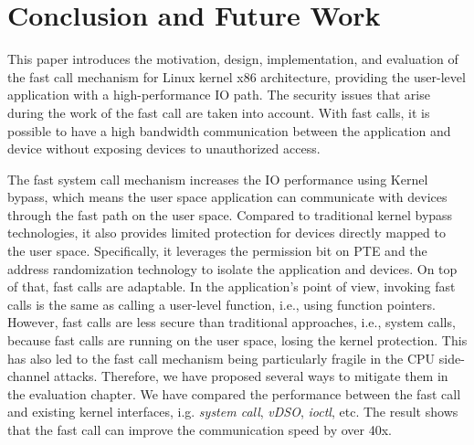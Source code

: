 \chapter{Conclusion and Future Work}
\label{sec:conclusion}




This paper introduces the motivation, design, implementation, 
and evaluation of the fast call mechanism for Linux kernel x86 
architecture, providing the user-level application with a 
high-performance IO path. The security issues that arise 
during the work of the fast call are taken into account. 
With fast calls, it is possible to have a high bandwidth 
communication between the application and device without 
exposing devices to unauthorized access.

The fast system call mechanism increases the IO performance using 
Kernel bypass, which means the user space application can communicate 
with devices through the fast path on the user space. Compared to 
traditional kernel bypass technologies, it also provides limited 
protection for devices directly mapped to the user space. 
Specifically, it leverages the permission bit on PTE and 
the address randomization technology to isolate the 
application and devices. On top of that,  fast calls 
are adaptable. In the application's point of view, 
invoking fast calls is the same as calling a user-level 
function, i.e., using function pointers.  However,  
fast calls are less secure than traditional approaches, i.e., 
system calls, because fast calls are running on the user space, 
losing the kernel protection.  This has also led to the fast 
call mechanism being particularly fragile in the CPU side-channel 
attacks. Therefore, we have proposed several ways to mitigate them 
in the evaluation chapter. 
We have compared the performance between the fast call and 
existing kernel interfaces, i.g. \emph{system call}, \emph{vDSO}\cite{9}, \emph{ioctl}, etc. 
The result shows that the fast call can improve the communication 
speed by over 40x.


